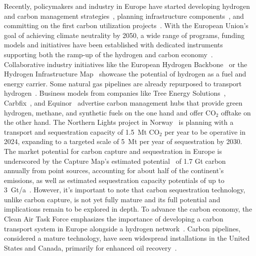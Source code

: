 \documentclass[twocolumn]{article}
\newcommand{\COtwo}{CO$_2$}
\begin{document}
Recently, policymakers and industry in Europe have started developing hydrogen and carbon management strategies~\cite{GermanyDevelopingStrategy2023,CarbonManagementStrategie}, planning infrastructure components~\cite{CONetz}, and committing on the first carbon utilization projects~\cite{EFuelsPilotPlant2022,OrstedAssumesFull,GROUNDBREAKINGEFUELPRODUCTION,DLREfuelsDLR}. With the European Union's goal of achieving climate neutrality by 2050, a wide range of programs, funding models and initiatives have been established with dedicated instruments supporting both the ramp-up of the hydrogen and carbon economy~\cite{eu2023netzero,europeangreendeal,europeaninnovationfund}.
Collaborative industry initiatives like the European Hydrogen Backbone~\cite{gasforclimateEuropeanHydrogenBackbone2022} or the Hydrogen Infrastructure Map~\cite{H2InfrastructureMap} showcase the potential of hydrogen as a fuel and energy carrier. Some natural gas pipelines are already repurposed to transport hydrogen~\cite{RohrFreiFuer}. Business models from companies like Tree Energy Solutions~\cite{TESHydrogenLife2023}, Carbfix~\cite{WeTurnCO2}, and Equinor~\cite{adomaitisEquinorRWEBuild2023} advertise carbon management hubs that provide green hydrogen, methane, and synthetic fuels on the one hand and offer \COtwo{} offtake on the other hand. The Northern Lights project in Norway~\cite{NorthernLightsWhat} is planning with a transport and sequestration capacity of 1.5~Mt \COtwo{} per year to be operative in 2024, expanding to a targeted scale of 5~Mt per year of sequestration by 2030.
The market potential for carbon capture and sequestration in Europe is underscored by the Capture Map's estimated potential~\cite{ToolsGreenTransition} of 1.7 Gt carbon annually from point sources, accounting for about half of the continent's emissions, as well as estimated sequestration capacity potentials of up to 3~Gt/a~\cite{europeancommissionEuropeanCO2Storage}. However, it's important to note that carbon sequestration technology, unlike carbon capture, is not yet fully mature and its full potential and implications remain to be explored in depth.
To advance the carbon economy, the Clean Air Task Force emphasizes the importance of developing a carbon transport system in Europe alongside a hydrogen network~\cite{lockwoodEuropeanStrategyCarbon}. Carbon pipelines, considered a mature technology, have seen widespread installations in the United States and Canada, primarily for enhanced oil recovery~\cite{righettiSitingCarbonDioxide2017,friedmannNETZEROGEOSPHERICRETURN}.
\end{document}
